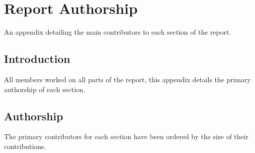 \chapter{Report Authorship} \label{App:Report Authorship}

\begin{preamble}
	An appendix detailing the main contributors to each section of the report.
\end{preamble}

\section{Introduction}

All members worked on all parts of the report, this appendix details the primary authorship of each section.

\section{Authorship}

The primary contributors for each section have been ordered by the size of their contributions.


